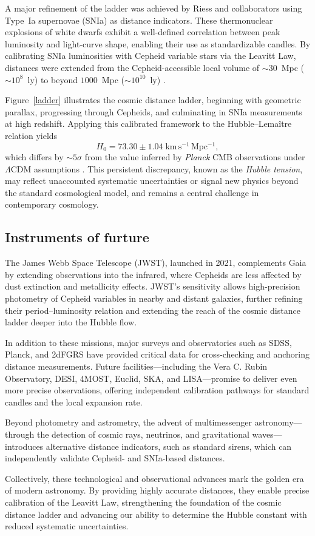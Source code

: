 

A major refinement of the ladder was achieved by Riess and collaborators using Type~Ia supernovae (SNIa) as distance indicators. These thermonuclear explosions of white dwarfs exhibit a well-defined correlation between peak luminosity and light-curve shape, enabling their use as standardizable candles. By calibrating SNIa luminosities with Cepheid variable stars via the Leavitt Law, distances were extended from the Cepheid-accessible local volume of $\sim 30$~Mpc ($\sim 10^8$~ly) to beyond $1000$~Mpc ($\sim 10^{10}$~ly) \citep{1998riess}. 

Figure~\ref{ladder} illustrates the cosmic distance ladder, beginning with geometric parallax, progressing through Cepheids, and culminating in SNIa measurements at high redshift. Applying this calibrated framework to the Hubble--Lemaître relation yields
\[
H_0 = 73.30 \pm 1.04 \; \mathrm{km\,s^{-1}\,Mpc^{-1}},
\]
which differs by $\sim 5\sigma$ from the value inferred by \emph{Planck} CMB observations under $\Lambda$CDM assumptions \citep{2022riess,2018planck}. This persistent discrepancy, known as the \emph{Hubble tension}, may reflect unaccounted systematic uncertainties or signal new physics beyond the standard cosmological model, and remains a central challenge in contemporary cosmology.


\subsection{Instruments of furture}
The James Webb Space Telescope (JWST), launched in 2021, complements Gaia by extending observations into the infrared, where Cepheids are less affected by dust extinction and metallicity effects. JWST’s sensitivity allows high-precision photometry of Cepheid variables in nearby and distant galaxies, further refining their period--luminosity relation and extending the reach of the cosmic distance ladder deeper into the Hubble flow.

In addition to these missions, major surveys and observatories such as SDSS, Planck, and 2dFGRS have provided critical data for cross-checking and anchoring distance measurements. Future facilities—including the Vera C. Rubin Observatory, DESI, 4MOST, Euclid, SKA, and LISA—promise to deliver even more precise observations, offering independent calibration pathways for standard candles and the local expansion rate.

Beyond photometry and astrometry, the advent of multimessenger astronomy—through the detection of cosmic rays, neutrinos, and gravitational waves—introduces alternative distance indicators, such as standard sirens, which can independently validate Cepheid- and SNIa-based distances. 

Collectively, these technological and observational advances mark the golden era of modern astronomy. By providing highly accurate distances,  they enable precise calibration of the Leavitt Law, strengthening the foundation of the cosmic distance ladder and advancing our ability to determine the Hubble constant with reduced systematic uncertainties.
